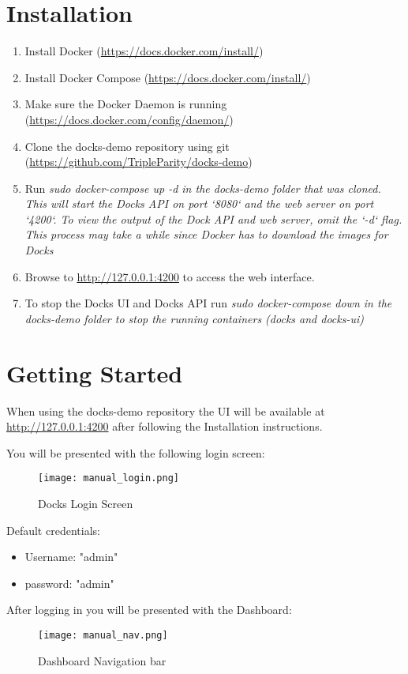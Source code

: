 \documentclass[]{article}
\begin{document}
\section{Installation}
\begin{enumerate}
	\item Install Docker (\url{https://docs.docker.com/install/})
	\item Install Docker Compose (\url{https://docs.docker.com/install/})
	\item Make sure the Docker Daemon is running (\url{https://docs.docker.com/config/daemon/})
	\item Clone the docks-demo repository using git (\url{https://github.com/TripleParity/docks-demo})
	\item Run \em{sudo docker-compose up -d} in the \em{docks-demo} folder that was cloned. This will start the Docks API on port `8080` and the web server on port `4200`. To view the output of the Dock API and web server, omit the `-d` flag. This process may take a while since Docker has to download the images for Docks
	\item Browse to \url{http://127.0.0.1:4200} to access the web interface.
	\item To stop the Docks UI and Docks API run \em{sudo docker-compose down} in the \em{docks-demo} folder to stop the running containers (docks and docks-ui)
\end{enumerate}


\section{Getting Started}
When using the docks-demo repository the UI will be available at \url{http://127.0.0.1:4200} after following the Installation instructions.

You will be presented with the following login screen:

\begin{figure}[H]
	\centering
	\texttt{[image: manual\_login.png]}
	\caption{Docks Login Screen}
\end{figure}

Default credentials:
\begin{itemize}
	\item Username: "admin"
	\item password: "admin"
\end{itemize}

After logging in you will be presented with the Dashboard:
\begin{figure}[H]
	\centering
	\texttt{[image: manual\_nav.png]}
	\caption{Dashboard Navigation bar}
\end{figure}
\end{document}
